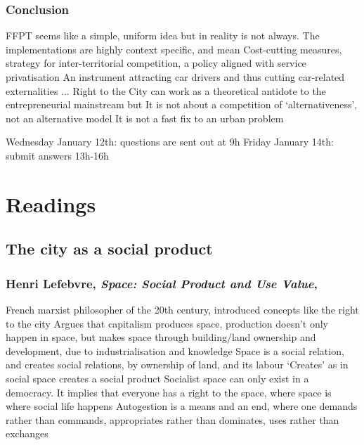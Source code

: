 \documentclass{article}
\begin{document}
\subsubsection{Conclusion}

\begin{outline}
	\1 FFPT seems like a simple, uniform idea but in reality is not always. The implementations are highly context specific, and mean
		\2 Cost-cutting measures, strategy for inter-territorial competition, a policy aligned with service privatisation
		\2 An instrument attracting car drivers and thus cutting car-related externalities
		\2 ...
	\1 Right to the City can work as a theoretical antidote to the entrepreneurial mainstream but
		\2 It is not about a competition of `alternativeness', not an alternative model
		\2 It is not a fast fix to an urban problem
\end{outline}




Wednesday January 12th: questions are sent out at 9h
Friday January 14th: submit answers 13h-16h


\section{Readings}

\subsection{The city as a social product}

\subsubsection{Henri Lefebvre, \textit{Space: Social Product and Use Value}, }

\begin{outline}
	\1 French marxist philosopher of the 20th century, introduced concepts like the right to the city
	\1 Argues that capitalism produces space, production doesn't only happen in space, but makes space through building/land ownership and development, due to industrialisation and knowledge
	\1 Space is a social relation, and creates social relations, by ownership of land, and its labour
		\2 `Creates' as in social space creates a social product
	\1 Socialist space can only exist in a democracy. It implies that everyone has a right to the space, where space is where social life happens
	\1 Autogestion is a means and an end, where one demands rather than commands, appropriates rather than dominates, uses rather than exchanges
\end{outline}
\end{document}
